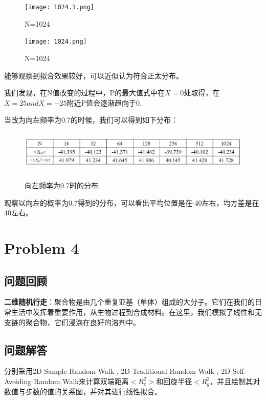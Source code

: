 \documentclass[12pt,a4paper]{article}%
\begin{document}
\begin{figure}[H]%
    \centering
    \begin{minipage}{0.48\textwidth}
        \centering
        \texttt{[image: 1024.1.png]}
        \caption{\fontsize{10pt}{15pt}\selectfont N=1024}
    \end{minipage}
    \hspace{0cm}%
    \hfill%
    \begin{minipage}{0.48\textwidth}
        \centering
        \texttt{[image: 1024.png]}
        \caption{\fontsize{10pt}{15pt}\selectfont N=1024}
    \end{minipage}\label{fig:figure3}
\end{figure}

能够观察到拟合效果较好，可以近似认为符合正太分布。

我们发现，在N值改变的过程中，P的最大值式中在$X=0$处取得，在$X=25 and X=-25$附近P值会逐渐趋向于0.

当改为向左频率为0.7的时候，我们可以得到如下分布：
\begin{figure}[htbp]
    \centering
    \includegraphics[height=2cm]{P3_2.jpg}\label{fig:figure4}
    \caption{向左频率为0.7时的分布}
\end{figure}

观察以向左的概率为0.7得到的分布，可以看出平均位置是在-40左右，均方差是在40左右。

\section{Problem 4}
\subsection{问题回顾}
\textbf{二维随机行走}：聚合物是由几个重复亚基（单体）组成的大分子。它们在我们的日常生活中发挥着重要作用，从生物过程到合成材料。在这里，我们模拟了线性和无支链的聚合物，它们浸泡在良好的溶剂中。
\subsection{问题解答}
分别采用2D Sample Random Walk , 2D Traditional Random Walk , 2D Self-Avoiding Random Walk来计算双端距离$<R_e^2>$和回旋半径$<R_g^2$，并且绘制其对数值与步数的值的关系图，并对其进行线性拟合。
\end{document}
